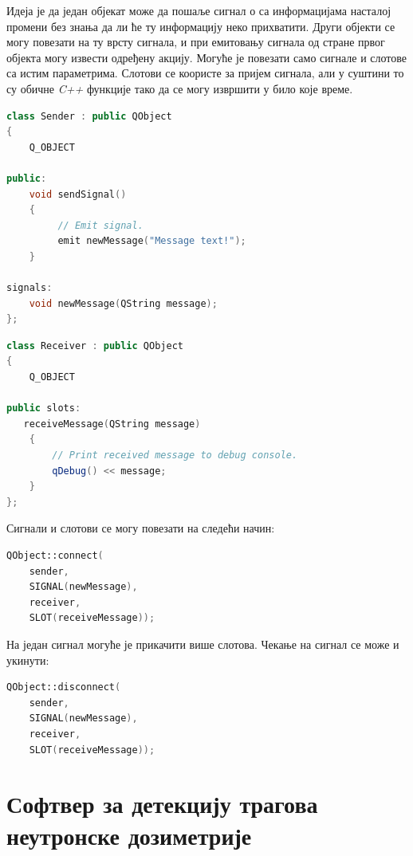 \documentclass[12pt,a4paper,serbian,oneside]{book}
\begin{document}
Идеја је да један објекат може да пошаље сигнал о са информацијама насталој промени без знања да ли ће ту информацију неко прихватити. Други објекти се могу повезати на ту врсту сигнала, и при емитовању сигнала од стране првог објекта могу извести одређену акцију. Могуће је повезати само сигнале и слотове са истим параметрима. Слотови се коористе за пријем сигнала, али у суштини то су обичне \textit{C++} функције тако да се могу извршити у било које време.

\begin{lstlisting}[language=C++,label=lst:signal_and_slot,caption=Дефиниција и емитовање сигнала]
class Sender : public QObject
{
    Q_OBJECT

public:
    void sendSignal()
    {
         // Emit signal.
         emit newMessage("Message text!");
    }

signals:
    void newMessage(QString message);
};
\end{lstlisting}

\begin{lstlisting}[language=C++,label=lst:signal_and_slot,caption=Дефиниција слота]
class Receiver : public QObject
{
    Q_OBJECT

public slots:
   receiveMessage(QString message)
    {
        // Print received message to debug console.
        qDebug() << message;
    }
};
\end{lstlisting}

Сигнали и слотови се могу повезати на следећи начин:

\begin{lstlisting}[language=C++,label=lst:signal_and_slot,caption=Повезивање сигнала и слотова]
QObject::connect(
    sender,
    SIGNAL(newMessage),
    receiver,
    SLOT(receiveMessage));
\end{lstlisting}

На један сигнал могуће је прикачити више слотова. Чекање на сигнал се може и укинути:

\begin{lstlisting}[language=C++,label=lst:signal_and_slot,caption=Укидање везе сигнала и слота]
QObject::disconnect(
    sender,
    SIGNAL(newMessage),
    receiver,
    SLOT(receiveMessage));
\end{lstlisting}

%
%
%

\chapter{Софтвер за детекцију трагова неутронске дозиметрије}
\end{document}
